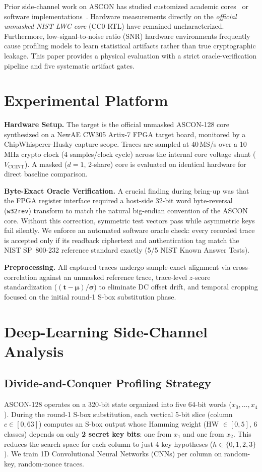 \documentclass[conference]{IEEEtran}
\begin{document}
Prior side-channel work on ASCON has studied customized academic cores~\cite{scarl} or software implementations~\cite{rezaeezade}. Hardware measurements directly on the \emph{official unmasked NIST LWC core} (CC0 RTL) have remained uncharacterized. Furthermore, low-signal-to-noise ratio (SNR) hardware environments frequently cause profiling models to learn statistical artifacts rather than true cryptographic leakage. This paper provides a physical evaluation with a strict oracle-verification pipeline and five systematic artifact gates.

\section{Experimental Platform}
\textbf{Hardware Setup.} The target is the official unmasked ASCON-128 core synthesized on a NewAE CW305 Artix-7 FPGA target board, monitored by a ChipWhisperer-Husky capture scope. Traces are sampled at 40\,MS/s over a 10\,MHz crypto clock (4 samples/clock cycle) across the internal core voltage shunt ($V_{\text{CCINT}}$). A masked ($d{=}1$, 2-share) core is evaluated on identical hardware for direct baseline comparison.

\textbf{Byte-Exact Oracle Verification.} A crucial finding during bring-up was that the FPGA register interface required a host-side 32-bit word byte-reversal (\texttt{w32rev}) transform to match the natural big-endian convention of the ASCON core. Without this correction, symmetric test vectors pass while asymmetric keys fail silently. We enforce an automated software oracle check: every recorded trace is accepted only if its readback ciphertext and authentication tag match the NIST SP~800-232 reference standard exactly (5/5 NIST Known Answer Tests).

\textbf{Preprocessing.} All captured traces undergo sample-exact alignment via cross-correlation against an unmasked reference trace, trace-level $z$-score standardization ($(\mathbf{t}-\boldsymbol{\mu})/\boldsymbol{\sigma}$) to eliminate DC offset drift, and temporal cropping focused on the initial round-1 S-box substitution phase.

\section{Deep-Learning Side-Channel Analysis}
\subsection{Divide-and-Conquer Profiling Strategy}
ASCON-128 operates on a 320-bit state organized into five 64-bit words ($x_0,\dots,x_4$). During the round-1 S-box substitution, each vertical 5-bit slice (column $c \in [0,63]$) computes an S-box output whose Hamming weight (HW $\in [0,5]$, 6 classes) depends on only \textbf{2 secret key bits}: one from $x_1$ and one from $x_2$. This reduces the search space for each column to just 4 key hypotheses ($h \in \{0,1,2,3\}$). We train 1D Convolutional Neural Networks (CNNs) per column on random-key, random-nonce traces.
\end{document}
